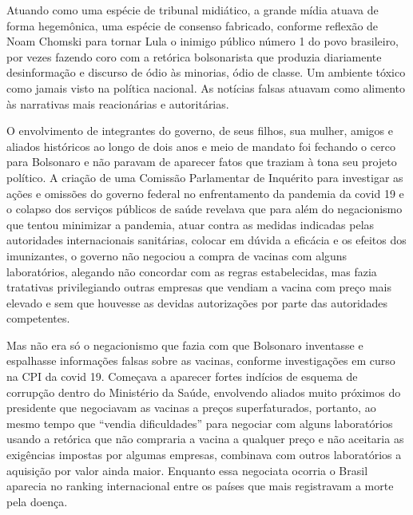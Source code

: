 Atuando como uma espécie de tribunal midiático, a grande mídia atuava de
forma hegemônica, uma espécie de consenso fabricado, conforme reflexão
de Noam Chomski para tornar Lula o inimigo público número 1 do povo
brasileiro, por vezes fazendo coro com a retórica bolsonarista que
produzia diariamente desinformação e discurso de ódio às minorias, ódio
de classe. Um ambiente tóxico como jamais visto na política nacional. As
notícias falsas atuavam como alimento às narrativas mais reacionárias e
autoritárias.

O envolvimento de integrantes do governo, de seus filhos, sua mulher,
amigos e aliados históricos ao longo de dois anos e meio de mandato foi
fechando o cerco para Bolsonaro e não paravam de aparecer fatos que
traziam à tona seu projeto político. A criação de uma Comissão
Parlamentar de Inquérito para investigar as ações e omissões do governo
federal no enfrentamento da pandemia da covid 19 e o colapso dos
serviços públicos de saúde revelava que para além do negacionismo que
tentou minimizar a pandemia, atuar contra as medidas indicadas pelas
autoridades internacionais sanitárias, colocar em dúvida a eficácia e os
efeitos dos imunizantes, o governo não negociou a compra de vacinas com
alguns laboratórios, alegando não concordar com as regras estabelecidas,
mas fazia tratativas privilegiando outras empresas que vendiam a vacina
com preço mais elevado e sem que houvesse as devidas autorizações por
parte das autoridades competentes.

Mas não era só o negacionismo que fazia com que Bolsonaro inventasse e
espalhasse informações falsas sobre as vacinas, conforme investigações
em curso na CPI da covid 19. Começava a aparecer fortes indícios de
esquema de corrupção dentro do Ministério da Saúde, envolvendo aliados
muito próximos do presidente que negociavam as vacinas a preços
superfaturados, portanto, ao mesmo tempo que ``vendia dificuldades''
para negociar com alguns laboratórios usando a retórica que não
compraria a vacina a qualquer preço e não aceitaria as exigências
impostas por algumas empresas, combinava com outros laboratórios a
aquisição por valor ainda maior. Enquanto essa negociata ocorria o
Brasil aparecia no ranking internacional entre os países que mais
registravam a morte pela doença.

